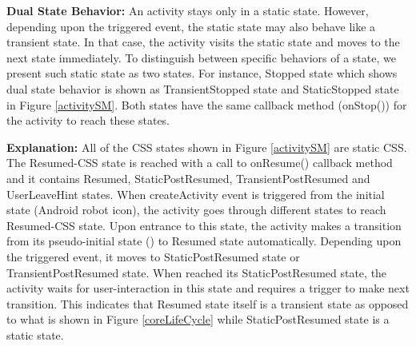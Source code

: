 \documentclass[10pt]{elsarticle}
\begin{document}
{\noindent \bf Dual State Behavior:} An activity stays only in a static state. However, depending upon the triggered event, the static state may also behave like a transient state. In that case, the activity visits the static state and moves to the next state immediately. To distinguish between specific behaviors of a state, we present such static state as two states. For instance, Stopped state which shows dual state behavior is shown as TransientStopped state and StaticStopped state in Figure \ref{activitySM}. Both states have the same callback method ({\ttfamily onStop()}) for the activity to reach these states. 

{\noindent \bf Explanation:} All of the CSS states shown in Figure \ref{activitySM} are static CSS. The Resumed-CSS state is reached with a call to {\ttfamily onResume()} callback method and it contains Resumed, StaticPostResumed, TransientPostResumed and UserLeaveHint states. When createActivity event is triggered from the initial state (Android robot icon), the activity goes through different states to reach Resumed-CSS state. Upon entrance to this state, the activity makes a transition from its pseudo-initial state (\bulletarrow) to Resumed state automatically. Depending upon the triggered event, it moves to StaticPostResumed state or TransientPostResumed state. When reached its StaticPostResumed state, the activity waits for user-interaction in this state and requires a trigger to make next transition. This indicates that Resumed state itself is a transient state as opposed to what is shown in Figure \ref{coreLifeCycle} while StaticPostResumed state is a static state. 
\end{document}
